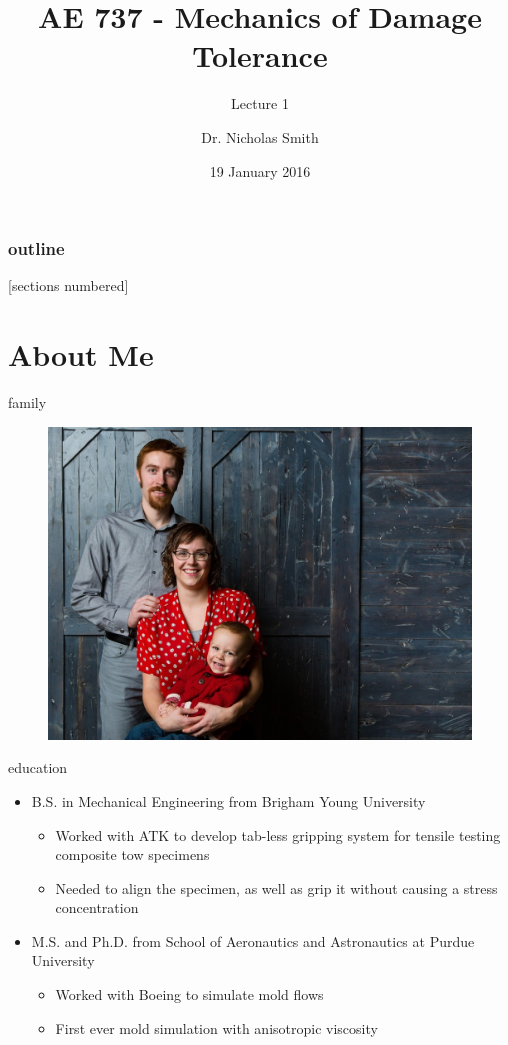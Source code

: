 \documentclass[10pt]{beamer}
\title{AE 737 - Mechanics of Damage Tolerance}
\subtitle{Lecture 1}
\date{19 January 2016}
\author{Dr. Nicholas Smith}
\institute{Wichita State University, Department of Aerospace Engineering}
\begin{document}
\maketitle

\begin{frame}
  \frametitle{outline}
  [sections numbered]
  \tableofcontents[hideallsubsections]
\end{frame}

\section{About Me}

\begin{frame}{family}
      
\begin{figure}
\centering
\includegraphics[width=0.7\linewidth]{./Family_photo}
\label{fig:Family_photo}
\end{figure}

\end{frame}

\begin{frame}{education}
\begin{itemize}
\item B.S. in Mechanical Engineering from Brigham Young University
\begin{itemize}
\item Worked with ATK to develop tab-less gripping system for tensile testing composite tow specimens
\item Needed to align the specimen, as well as grip it without causing a stress concentration
\end{itemize}
\item M.S. and Ph.D. from School of Aeronautics and Astronautics at Purdue University
\begin{itemize}
\item Worked with Boeing to simulate mold flows
\item First ever mold simulation with anisotropic viscosity
\end{itemize}
\end{itemize}
\end{frame}
\end{document}
